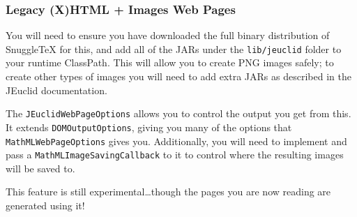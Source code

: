 \subsubsection*{Legacy (X)HTML + Images Web Pages}

You will need to ensure you have downloaded the full binary distribution of
SnuggleTeX for this, and add all of the JARs under the \verb|lib/jeuclid| folder
to your runtime ClassPath. This will allow you to create PNG images safely; to
create other types of images you will need to add extra JARs as described in
the JEuclid documentation.

The \verb|JEuclidWebPageOptions| allows you to control the output you
get from this. It extends \verb|DOMOutputOptions|, giving you many of the
options that \verb|MathMLWebPageOptions| gives you. Additionally, you will
need to implement and pass a \verb|MathMLImageSavingCallback| to it to control where
the resulting images will be saved to.

This feature is still experimental\ldots though the pages you are now reading
are generated using it!
